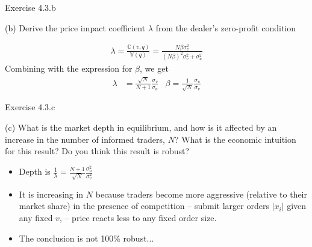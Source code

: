 \documentclass[english,10pt,aspectratio=169]{beamer}
\begin{document}
\begin{frame}{Exercise 4.3.b}
	\begin{exampleblock}{}
		(b) Derive the price impact coefficient $\lambda$ from the dealer's zero-profit condition
	\end{exampleblock}

	\pause
	
	\begin{align*}
		\lambda = \frac{\mathbb{C}(v,q)}{\mathbb{V}(q)} = \frac{N \beta \sigma^2_v}{(N \beta)^2 \sigma^2_v + \sigma^2_u}	
	\end{align*}
	Combining with the expression for $\beta$, we get
	\begin{align*}
		\lambda &= \frac{\sqrt{N}}{N+1} \frac{\sigma_v}{\sigma_u} 
		&
		\beta = \frac{1}{\sqrt{N}} \frac{\sigma_u}{\sigma_v}
	\end{align*}
\end{frame}


\begin{frame}{Exercise 4.3.c}
	\begin{exampleblock}{}
		(c) What is the market depth in equilibrium, and how is it affected by an increase in the number of informed traders, $N$? What is the economic intuition for this result?
		Do you think this result is robust?
	\end{exampleblock}
	
	\pause
	
	\begin{itemize}
		\item Depth is $\frac{1}{\lambda} = \frac{N+1}{\sqrt{N}} \frac{\sigma^2_u}{\sigma^2_v} $
		\item It is increasing in $N$ because traders become more aggressive (relative to their market share) in the presence of competition -- submit larger orders $|x_i|$ given any fixed $v$, -- price reacts less to any fixed order size.
		\item The conclusion is not 100\% robust...
	\end{itemize}
\end{frame}


\end{document}
